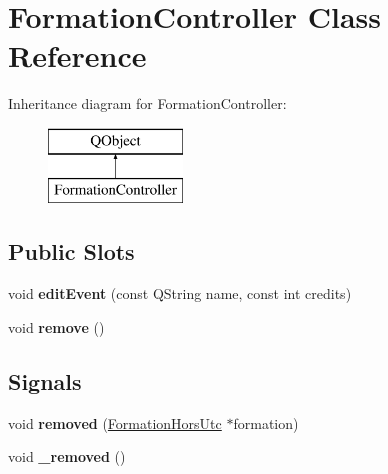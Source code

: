 \hypertarget{classFormationController}{\section{Formation\+Controller Class Reference}
\label{classFormationController}
}
Inheritance diagram for Formation\+Controller\+:\begin{figure}[H]
\begin{center}
\leavevmode
\includegraphics[height=2.000000cm]{classFormationController}
\end{center}
\end{figure}
\subsection*{Public Slots}
\begin{DoxyCompactItemize}
\item 
\hypertarget{classFormationController_a6f209a01ee733426791619c2e17339be}{void {\bfseries edit\+Event} (const Q\+String name, const int credits)}\label{classFormationController_a6f209a01ee733426791619c2e17339be}

\item 
\hypertarget{classFormationController_a77df1d85adb3b9cd5d9baeaee858d87e}{void {\bfseries remove} ()}\label{classFormationController_a77df1d85adb3b9cd5d9baeaee858d87e}

\end{DoxyCompactItemize}
\subsection*{Signals}
\begin{DoxyCompactItemize}
\item 
\hypertarget{classFormationController_a409df906810b5cda8e2d21f0da29b967}{void {\bfseries removed} (\hyperlink{classFormationHorsUtc}{Formation\+Hors\+Utc} $\ast$formation)}\label{classFormationController_a409df906810b5cda8e2d21f0da29b967}

\item 
\hypertarget{classFormationController_aa3391fadf4675a73fcef4ea1fc1353d2}{void {\bfseries \+\_\+removed} ()}\label{classFormationController_aa3391fadf4675a73fcef4ea1fc1353d2}

\end{DoxyCompactItemize}
